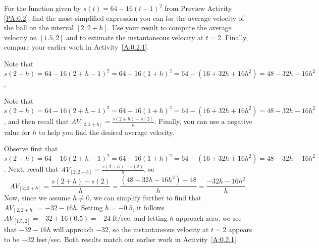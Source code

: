 \begin{activity} \label{A:1.1.3}
For the function given by $s(t) = 64 - 16(t-1)^2$ from Preview Activity \ref{PA:0.2}, find the most simplified expression you can for the average velocity of the ball on the interval $[2, 2+h]$.  Use your result to compute the average velocity on $[1.5,2]$ and to estimate the instantaneous velocity at $t = 2$.  Finally, compare your earlier work in Activity~\ref{A:0.2.1}.
\end{activity} 
\begin{smallhint}
Note that $s(2+h) = 64 - 16(2+h-1)^2 = 64 - 16(1+h)^2 = 64 - (16 + 32h + 16h^2) = 48 - 32h - 16h^2$.
\end{smallhint}
\begin{bighint}
Note that $s(2+h) = 64 - 16(2+h-1)^2 = 64 - 16(1+h)^2 = 64 - (16 + 32h + 16h^2) = 48 - 32h - 16h^2$, and then recall that $AV_{[2, 2+h]} = \frac{s(2+h) - s(2)}{h}$.  Finally, you can use a negative value for $h$ to help you find the desired average velocity.
\end{bighint}
\begin{activitySolution}
Observe first that $s(2+h) = 64 - 16(2+h-1)^2 = 64 - 16(1+h)^2 = 64 - (16 + 32h + 16h^2) = 48 - 32h - 16h^2$.  Next, recall that $AV_{[2, 2+h]} = \frac{s(2+h) - s(2)}{h}$, so
$$AV_{[2, 2+h]} = \frac{s(2+h) - s(2)}{h} = \frac{(48 - 32h - 16h^2)-48}{h} = \frac{-32h - 16h^2}{h}.$$
Now, since we assume $h \ne 0$, we can simplify further to find that $AV_{[2, 2+h]} = -32 - 16h$.  Setting $h = -0.5$, it follows $AV_{[1.5,2]} = -32 + 16(0.5) = -24$ ft/sec, and letting $h$ approach zero, we see that $-32 - 16h$ will approach $-32$, so the instantaneous velocity at $t = 2$ appears to be $-32$ feet/sec.  Both results match our earlier work in Activity~\ref{A:0.2.1}.
\end{activitySolution}
\aftera